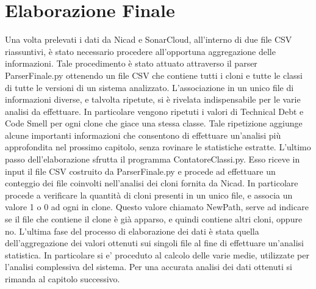 \section{Elaborazione Finale}
Una volta prelevati i dati da Nicad e SonarCloud, all'interno di due file CSV riassuntivi, è stato necessario procedere all'opportuna aggregazione delle informazioni. Tale procedimento è stato attuato attraverso il parser ParserFinale.py ottenendo un file CSV che contiene tutti i cloni e tutte le classi di tutte le versioni di un sistema analizzato. L'associazione in un unico file di informazioni diverse, e talvolta ripetute, si è rivelata indispensabile per le varie analisi da effettuare. In particolare vengono ripetuti i valori di Technical Debt e Code Smell per ogni clone che giace una stessa classe. Tale ripetizione aggiunge alcune importanti informazioni che consentono di effettuare un'analisi più approfondita nel prossimo capitolo, senza rovinare le statistiche estratte.
L'ultimo passo dell'elaborazione sfrutta il programma ContatoreClassi.py. Esso riceve in input il file CSV costruito da ParserFinale.py e procede ad effettuare un conteggio dei file coinvolti nell'analisi dei cloni fornita da Nicad. In particolare procede a verificare la quantità di cloni presenti in un unico file, e associa un valore 1 o 0 ad ogni in clone. Questo valore chiamato NewPath, serve ad indicare se il file che contiene il clone è già apparso, e quindi contiene altri cloni, oppure no.
L'ultima fase del processo di elaborazione dei dati è stata quella dell'aggregazione dei valori ottenuti sui singoli file al fine di effettuare un'analisi statistica. In particolare si e' proceduto al calcolo delle varie medie, utilizzate per l'analisi complessiva del sistema. Per una accurata analisi dei dati ottenuti si rimanda al capitolo successivo.
